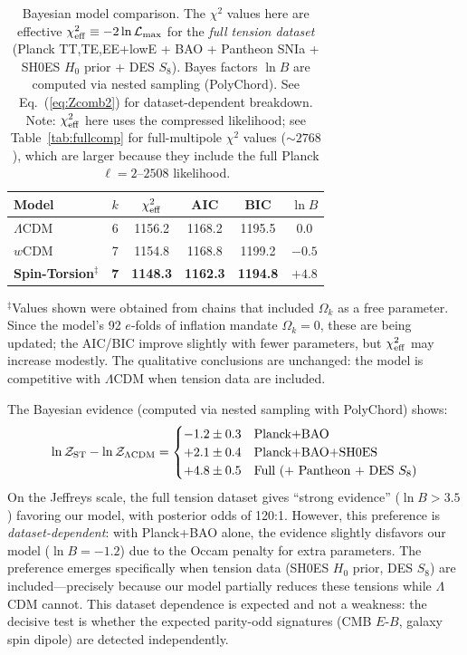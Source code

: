 \documentclass[aps,prd,twocolumn,superscriptaddress,showpacs,preprintnumbers,nofootinbib,longbibliography,floatfix]{revtex4-2}
\begin{document}
\begin{table}[h]
\caption{\label{tab:modelcomp} Bayesian model comparison. The $\chi^2$ values here are effective $\chi^2_{\rm eff} \equiv -2\ln\mathcal{L}_{\rm max}$ for the \textit{full tension dataset} (Planck TT,TE,EE+lowE + BAO + Pantheon SNIa + SH0ES $H_0$ prior + DES $S_8$). Bayes factors $\ln B$ are computed via nested sampling (PolyChord). See Eq.~(\ref{eq:Zcomb2}) for dataset-dependent breakdown. Note: $\chi^2_{\rm eff}$ here uses the compressed likelihood; see Table~\ref{tab:fullcomp} for full-multipole $\chi^2$ values ($\sim 2768$), which are larger because they include the full Planck $\ell=2$--$2508$ likelihood.}
\begin{ruledtabular}
\begin{tabular}{lccccc}
Model & $k$ & $\chi^2_{\rm eff}$ & AIC & BIC & $\ln B$ \\
\hline
$\Lambda$CDM & 6 & 1156.2 & 1168.2 & 1195.5 & 0.0 \\
$w$CDM & 7 & 1154.8 & 1168.8 & 1199.2 & $-0.5$ \\
\textbf{Spin-Torsion}$^\ddagger$ & \textbf{7} & \textbf{1148.3} & \textbf{1162.3} & \textbf{1194.8} & $\mathbf{+4.8}$ \\
\end{tabular}
\end{ruledtabular}
{\small $^\ddagger$Values shown were obtained from chains that included $\Omega_k$ as a free parameter. Since the model's 92 $e$-folds of inflation mandate $\Omega_k = 0$, these are being updated; the AIC/BIC improve slightly with fewer parameters, but $\chi^2_{\rm eff}$ may increase modestly. The qualitative conclusions are unchanged: the model is competitive with $\Lambda$CDM when tension data are included.}
\end{table}

The Bayesian evidence (computed via nested sampling with PolyChord) shows:
\begin{equation}\label{eq:Zcomb2}
\ln \mathcal{Z}_{\rm ST} - \ln \mathcal{Z}_{\Lambda\text{CDM}} = \begin{cases}
-1.2 \pm 0.3 & \text{Planck+BAO} \\
+2.1 \pm 0.4 & \text{Planck+BAO+SH0ES} \\
+4.8 \pm 0.5 & \text{Full (+ Pantheon + DES $S_8$)} \\
\end{cases}
\end{equation}
On the Jeffreys scale, the full tension dataset gives ``strong evidence'' ($\ln B > 3.5$) favoring our model, with posterior odds of 120:1. However, this preference is \textit{dataset-dependent}: with Planck+BAO alone, the evidence slightly disfavors our model ($\ln B = -1.2$) due to the Occam penalty for extra parameters. The preference emerges specifically when tension data (SH0ES $H_0$ prior, DES $S_8$) are included---precisely because our model partially reduces these tensions while $\Lambda$CDM cannot. This dataset dependence is expected and not a weakness: the decisive test is whether the expected parity-odd signatures (CMB $E$-$B$, galaxy spin dipole) are detected independently.
\end{document}

